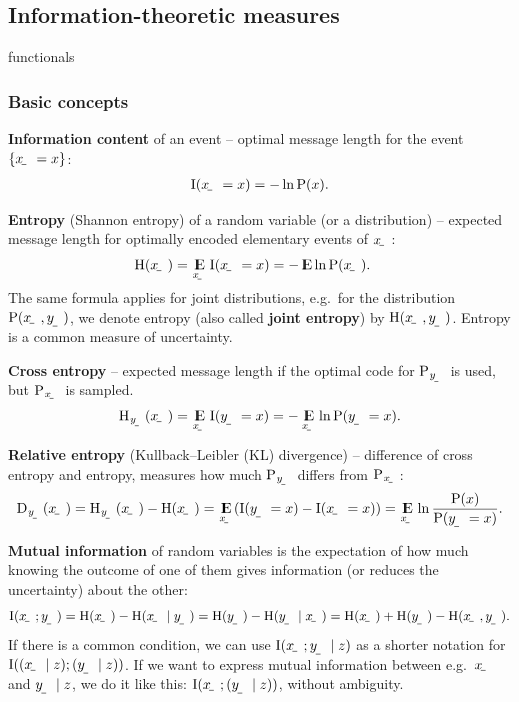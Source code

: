 \documentclass[oneside]{book}
\begin{document}
\subsection{Information-theoretic measures}

functionals

\subsubsection{Basic concepts}

\textbf{Information content} of an event -- optimal message length for the event $\event{\rvar x=x}$:
\begin{align}
\I(\rvar x=x) = -\ln\P(x) \text.
\end{align}

\textbf{Entropy} (Shannon entropy) of a random variable (or a distribution) -- expected message length for optimally encoded elementary events of $\rvar x$:
\begin{align}
    \H(\rvar x) &= \E_{\rvar x}\I(\rvar x=x) = -\E\ln\P(\rvar x) \text.
\end{align}
The same formula applies for joint distributions, e.g.\ for the distribution $\P(\rvar x,\rvar y)$, we denote entropy (also called \textbf{joint entropy}) by $\H(\rvar x,\rvar y)$. Entropy is a common measure of uncertainty.

\textbf{Cross entropy} -- expected message length if the optimal code for $\P_\rvar{y}$ is used, but $\P_\rvar{x}$ is sampled.
\begin{align}
    \H_\rvar{y}(\rvar x) = \E_{\rvar x}\I(\rvar y=x) = -\E_{\rvar x}\ln\P(\rvar y=x) \text.
\end{align}

\textbf{Relative entropy} (Kullback–Leibler (KL) divergence) -- difference of cross entropy and entropy, measures how much $\P_\rvar{y}$ differs from $\P_\rvar{x}$:
\begin{align}
    \Dist_\rvar{y}(\rvar x) = \H_\rvar{y}(\rvar x) - \H(\rvar x) = \E_\rvar{x}\del{\I(\rvar y=x)-\I(\rvar x=x)} = \E_\rvar{x}\ln\frac{\P(x)}{\P(\rvar y=x)} \text.
\end{align}

\textbf{Mutual information} of random variables is the expectation of how much knowing the outcome of one of them gives information (or reduces the uncertainty) about the other:
\begin{align}
    \I(\rvar x; \rvar y) = \H(\rvar x) - \H(\rvar x\mid\rvar y) = \H(\rvar y) - \H(\rvar y\mid\rvar x) = \H(\rvar x) +\H(\rvar y) - \H(\rvar x, \rvar y) \text.
\end{align}
If there is a common condition, we can use $\I\del{\rvar x; \rvar y\mid z}$ as a shorter notation for $\I\del{(\rvar x\mid z); (\rvar y\mid z)}$. If we want to express mutual information between e.g.\ $\rvar x$ and $\rvar y\mid z$, we do it like this: $\I(\rvar x;(\rvar y\mid z))$, without ambiguity.
\end{document}
